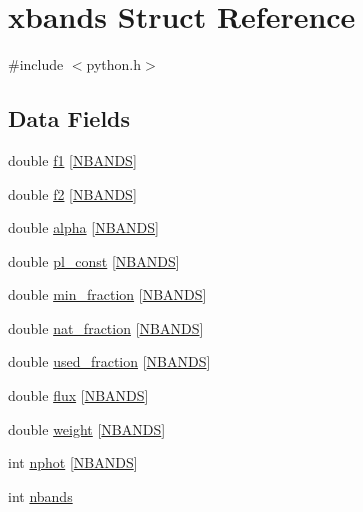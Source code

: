 \hypertarget{structxbands}{}\section{xbands Struct Reference}
\label{structxbands}


{\ttfamily \#include $<$python.\+h$>$}

\subsection*{Data Fields}
\begin{DoxyCompactItemize}
\item 
double \hyperlink{structxbands_a4822266ca02ed8a4b214e5efcd79256c}{f1} \mbox{[}\hyperlink{python_8h_a46ee023ac3f5d103e533843238d2e52a}{N\+B\+A\+N\+DS}\mbox{]}
\item 
double \hyperlink{structxbands_af398da6fd226bb4257ad64ac9704098a}{f2} \mbox{[}\hyperlink{python_8h_a46ee023ac3f5d103e533843238d2e52a}{N\+B\+A\+N\+DS}\mbox{]}
\item 
double \hyperlink{structxbands_a5fd1368571f38469e4b8f5ad19586279}{alpha} \mbox{[}\hyperlink{python_8h_a46ee023ac3f5d103e533843238d2e52a}{N\+B\+A\+N\+DS}\mbox{]}
\item 
double \hyperlink{structxbands_a162fb1999189dffd52bcd6d090792481}{pl\+\_\+const} \mbox{[}\hyperlink{python_8h_a46ee023ac3f5d103e533843238d2e52a}{N\+B\+A\+N\+DS}\mbox{]}
\item 
double \hyperlink{structxbands_a5a7f85ceee248b2268f8a37b6330fa57}{min\+\_\+fraction} \mbox{[}\hyperlink{python_8h_a46ee023ac3f5d103e533843238d2e52a}{N\+B\+A\+N\+DS}\mbox{]}
\item 
double \hyperlink{structxbands_a7fa4d027ede2f3658d73225c6292089c}{nat\+\_\+fraction} \mbox{[}\hyperlink{python_8h_a46ee023ac3f5d103e533843238d2e52a}{N\+B\+A\+N\+DS}\mbox{]}
\item 
double \hyperlink{structxbands_a0f946786fa05575c9da9d60699c45202}{used\+\_\+fraction} \mbox{[}\hyperlink{python_8h_a46ee023ac3f5d103e533843238d2e52a}{N\+B\+A\+N\+DS}\mbox{]}
\item 
double \hyperlink{structxbands_aaaed5eb418e48908a4e2c8f4dc0a42c3}{flux} \mbox{[}\hyperlink{python_8h_a46ee023ac3f5d103e533843238d2e52a}{N\+B\+A\+N\+DS}\mbox{]}
\item 
double \hyperlink{structxbands_abab6361efd17b70504fb67164711687a}{weight} \mbox{[}\hyperlink{python_8h_a46ee023ac3f5d103e533843238d2e52a}{N\+B\+A\+N\+DS}\mbox{]}
\item 
int \hyperlink{structxbands_acc3e184739961350ec8f40f7ecd5908a}{nphot} \mbox{[}\hyperlink{python_8h_a46ee023ac3f5d103e533843238d2e52a}{N\+B\+A\+N\+DS}\mbox{]}
\item 
int \hyperlink{structxbands_aad6fe819267976ae85b61e65e0b70f75}{nbands}
\end{DoxyCompactItemize}


